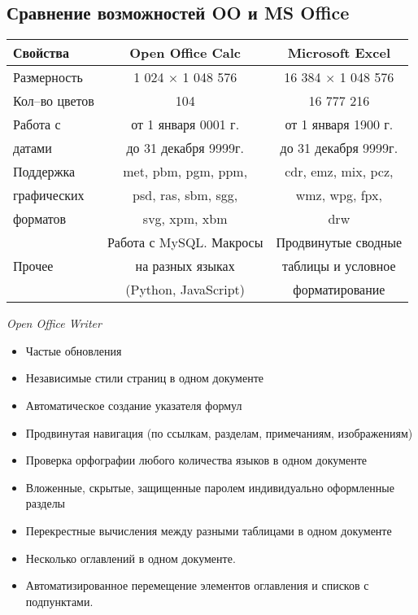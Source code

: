 \subsection{Сравнение возможностей OO и MS Office}
\begin{table}[!h]
 \begin{tabular}{|l|c|c|}
 \hline
 Свойства & Open Office Calc & Microsoft Excel \\
 \hline
 Размерность & 1 024 $\times$ 1 048 576  & 16 384 $\times$ 1 048 576 \\
 \hline
 Кол--во цветов & 104 & 16 777 216 \\
  \hline
 Работа с & от 1 января 0001 г. & от 1 января 1900 г. \\
 датами & до 31 декабря 9999г. & до 31 декабря 9999г. \\
 \hline
 Поддержка  & met, pbm, pgm, ppm,  & cdr, emz, mix, pcz, \\
 графических & psd, ras, sbm, sgg, &  wmz, wpg, fpx,  \\
 форматов & svg, xpm, xbm &  drw \\
 \hline
 & Работа с MySQL. Макросы & Продвинутые сводные  \\
 Прочее & на разных языках & таблицы и условное \\
 & (Python, JavaScript) & форматирование  \\
  \hline
 \end{tabular}

\end{table}
\begin{center}
  \emph{Open Office Writer}
\end{center}
\begin{itemize}
  \item Частые обновления
  \item Независимые стили страниц в одном документе
  \item Автоматическое создание указателя формул
  \item Продвинутая навигация (по ссылкам, разделам, примечаниям, изображениям)
  \item Проверка орфографии любого количества языков в одном документе
  \item Вложенные, скрытые, защищенные паролем индивидуально оформленные разделы
  \item Перекрестные вычисления между разными таблицами в одном документе
  \item Несколько оглавлений в одном документе.
  \item Автоматизированное перемещение элементов оглавления и списков с подпунктами.
\end{itemize}
